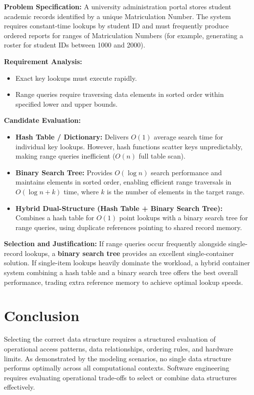 \documentclass[12pt]{report}
\begin{document}
\textbf{Problem Specification:} A university administration portal stores student academic records identified by a unique Matriculation Number. The system requires constant-time lookups by student ID and must frequently produce ordered reports for ranges of Matriculation Numbers (for example, generating a roster for student IDs between 1000 and 2000).

\textbf{Requirement Analysis:}
\begin{itemize}
    \item Exact key lookups must execute rapidly.
    \item Range queries require traversing data elements in sorted order within specified lower and upper bounds.
\end{itemize}

\textbf{Candidate Evaluation:}
\begin{itemize}
    \item \textbf{Hash Table / Dictionary:} Delivers $O(1)$ average search time for individual key lookups. However, hash functions scatter keys unpredictably, making range queries inefficient ($O(n)$ full table scan).
    \item \textbf{Binary Search Tree:} Provides $O(\log n)$ search performance and maintains elements in sorted order, enabling efficient range traversals in $O(\log n + k)$ time, where $k$ is the number of elements in the target range.
    \item \textbf{Hybrid Dual-Structure (Hash Table + Binary Search Tree):} Combines a hash table for $O(1)$ point lookups with a binary search tree for range queries, using duplicate references pointing to shared record memory.
\end{itemize}

\textbf{Selection and Justification:} If range queries occur frequently alongside single-record lookups, a \textbf{binary search tree} provides an excellent single-container solution. If single-item lookups heavily dominate the workload, a hybrid container system combining a hash table and a binary search tree offers the best overall performance, trading extra reference memory to achieve optimal lookup speeds.

\section{Conclusion}

Selecting the correct data structure requires a structured evaluation of operational access patterns, data relationships, ordering rules, and hardware limits. As demonstrated by the modeling scenarios, no single data structure performs optimally across all computational contexts. Software engineering requires evaluating operational trade-offs to select or combine data structures effectively.
\end{document}
